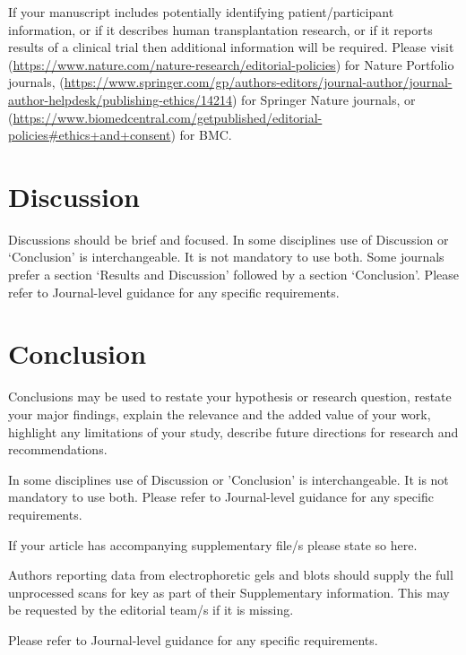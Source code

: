 \documentclass[pdflatex,sn-mathphys-num]{sn-jnl}%
\theoremstyle{thmstyleone}%
\theoremstyle{thmstyletwo}%
\theoremstyle{thmstylethree}%
\begin{document}
If your manuscript includes potentially identifying patient/participant information, or if it describes human transplantation research, or if it reports results of a clinical trial then  additional information will be required. Please visit (\url{https://www.nature.com/nature-research/editorial-policies}) for Nature Portfolio journals, (\url{https://www.springer.com/gp/authors-editors/journal-author/journal-author-helpdesk/publishing-ethics/14214}) for Springer Nature journals, or (\url{https://www.biomedcentral.com/getpublished/editorial-policies\#ethics+and+consent}) for BMC.

\section{Discussion}\label{sec12}

Discussions should be brief and focused. In some disciplines use of Discussion or `Conclusion' is interchangeable. It is not mandatory to use both. Some journals prefer a section `Results and Discussion' followed by a section `Conclusion'. Please refer to Journal-level guidance for any specific requirements. 

\section{Conclusion}\label{sec13}

Conclusions may be used to restate your hypothesis or research question, restate your major findings, explain the relevance and the added value of your work, highlight any limitations of your study, describe future directions for research and recommendations. 

In some disciplines use of Discussion or 'Conclusion' is interchangeable. It is not mandatory to use both. Please refer to Journal-level guidance for any specific requirements. 

\backmatter


If your article has accompanying supplementary file/s please state so here. 

Authors reporting data from electrophoretic gels and blots should supply the full unprocessed scans for key as part of their Supplementary information. This may be requested by the editorial team/s if it is missing.

Please refer to Journal-level guidance for any specific requirements.

\end{document}

